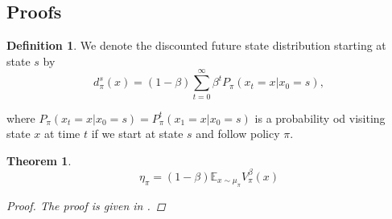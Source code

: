 \documentclass[11pt]{article}
\newcommand{\E}{\mathbb{E}}
\newtheorem{theorem}{Theorem}
\theoremstyle{definition}
\numberwithin{equation}{section}
\newtheorem{definition}{Definition}
\begin{document}
 





\subsection{Proofs}\label{sec:proofs}




  \begin{definition}
We denote  the discounted future state distribution starting at state $s$  by
\begin{equation}
d_\pi^s(x) = (1-\beta)\sum\limits_{t=0}^{\infty} \beta^t P_\pi(x_t = x| x_0 = s),
\end{equation}

where $P_\pi(x_t = x| x_0 = s) = P^t_\pi(x_1 = x| x_0 = s)$ is a probability od visiting state $x$ at time $t$ if we start at state $s$ and follow policy $\pi$.
\end{definition}



\begin{theorem}\label{Vnu}
\begin{equation}
\eta_\pi = (1-\beta) \E_{x\sim\mu_\pi} V^\beta_\pi(x)
\end{equation}

\begin{proof}
The proof is given in \cite[Section 10.4]{Sutton2018}.
\end{proof}
\end{theorem}
\end{document}
